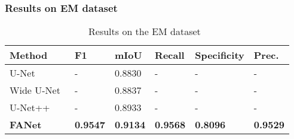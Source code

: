 \documentclass[journal]{IEEEtran}
\begin{document}
\subsubsection{Results on EM dataset}
\begin{table}[!t]
\footnotesize
\caption{Results on the EM dataset~\cite{cardona2010integrated}}
\vspace{0.1cm}
\begin{tabular}{@{}l|l|l|l|l|l@{}}
\toprule
\textbf{Method} &\textbf{F1} &\textbf{mIoU} &\textbf{Recall} &\textbf{Specificity} & \textbf{Prec.} \\ 
\hline
\hline
U-Net~\cite{ronneberger2015u}  & - & 0.8830 & - & - & - \\ Wide U-Net~\cite{zhou2018unet} & - & 0.8837 & - & - & - \\ U-Net++~\cite{zhou2019unet++} &- &0.8933 &- &- &- \\ \textbf{FANet}& \textbf{0.9547} & \textbf{0.9134} & \textbf{0.9568} & \textbf{0.8096} & \textbf{0.9529} \\ 
\bottomrule
\end{tabular}
\label{tab:emdataset}
\end{table}
\end{document}
